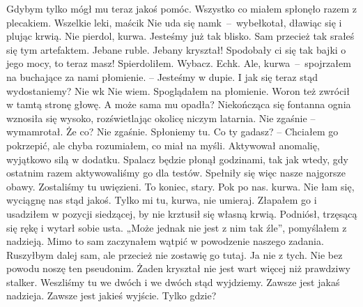 \documentclass[../MAIN.tex]{subfiles}
\begin{document}
Gdybym tylko mógł mu teraz jakoś pomóc. Wszystko co miałem spłonęło razem z plecakiem. Wszelkie leki, maści\3k
\sd
\xx Nie uda się nam\3k~--~wybełkotał, dławiąc się i plując krwią.
\xx Nie pierdol, kurwa. Jesteśmy już tak blisko. Sam przecież tak srałeś się tym artefaktem. Jebane ruble. Jebany kryształ! Spodobały ci się tak bajki o jego mocy, to teraz masz!
\xx Spierdoliłem. Wybacz.
\xx Ech\3k. Ale, kurwa~--~spojrzałem na buchające za nami płomienie. – Jesteśmy w dupie. I jak się teraz stąd wydostaniemy?
\xx Nie w\3k Nie wiem.
\qd
Spoglądałem na płomienie. Woron też zwrócił w tamtą stronę głowę. A może sama mu opadła? Niekończąca się fontanna ognia wznosiła się wysoko, rozświetlając okolicę niczym latarnia.
\sd
\xx Nie zgaśnie – wymamrotał.
\xx Że co?
\xx Nie zgaśnie. Spłoniemy tu.
\xx Co ty gadasz? – Chciałem go pokrzepić, ale chyba rozumiałem, co miał na myśli. Aktywował anomalię, wyjątkowo silą w dodatku. Spalacz będzie płonął godzinami, tak jak wtedy, gdy ostatnim razem aktywowaliśmy go dla testów. Spełniły się więc nasze najgorsze obawy. Zostaliśmy tu uwięzieni.
\xx To koniec, stary. Po\3k po nas. kurwa.
\xx Nie łam się, wyciągnę nas stąd jakoś. Tylko mi tu, kurwa, nie umieraj.
\qd
\mm Złapałem go i usadziłem w pozycji siedzącej, by nie krztusił się własną krwią. Podniósł, trzęsącą się rękę i wytarł sobie usta. „Może jednak nie jest z nim tak źle”, pomyślałem z nadzieją. Mimo to sam zaczynałem wątpić w powodzenie naszego zadania. Ruszyłbym dalej sam, ale przecież nie zostawię go tutaj. Ja nie z tych. Nie bez powodu noszę ten pseudonim. Żaden kryształ nie jest wart więcej niż prawdziwy stalker. Weszliśmy tu we dwóch i we dwóch stąd wyjdziemy. Zawsze jest jakaś nadzieja. Zawsze jest jakieś wyjście.
Tylko gdzie?
\end{document}

